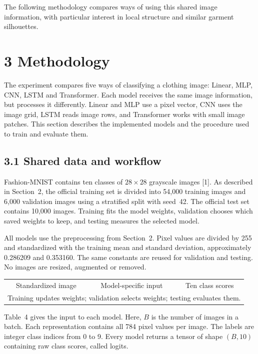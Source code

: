 The following methodology compares ways of using this shared image information,
with particular interest in local structure and similar garment silhouettes.


\section{3 Methodology}
\label{sec:fresh_methodology}
The experiment compares five ways of classifying a clothing image: Linear, MLP,
CNN, LSTM and Transformer. Each model receives the same image information, but
processes it differently. Linear and MLP use a pixel vector, CNN uses the image
grid, LSTM reads image rows, and Transformer works with small image patches.
This section describes the implemented models and the procedure used to train
and evaluate them.

\subsection{3.1 Shared data and workflow}
Fashion-MNIST contains ten classes of $28\times28$ grayscale images
[1]. As described in Section~2, the official training set is
divided into 54,000 training images and 6,000 validation images using a
stratified split with seed~42. The official test set contains 10,000 images.
Training fits the model weights, validation chooses which saved weights to
keep, and testing measures the selected model.

All models use the preprocessing from Section~2. Pixel values are divided by
255 and standardized with the training mean and standard deviation,
approximately 0.286209 and 0.353160. The same constants are reused for validation
and testing. No images are resized, augmented or removed.

\begin{center}
\small
\begin{tabular}{c@{\quad$\longrightarrow$\quad}c@{\quad$\longrightarrow$\quad}c}
Standardized image & Model-specific input & Ten class scores\\[5pt]
\multicolumn{3}{c}{Training updates weights; validation selects weights; testing evaluates them.}
\end{tabular}
\end{center}

Table~4 gives the input to each model. Here, $B$ is the
number of images in a batch. Each representation contains all 784 pixel values
per image. The labels are integer class indices from 0 to 9. Every model returns
a tensor of shape $(B,10)$ containing raw class scores, called logits.

